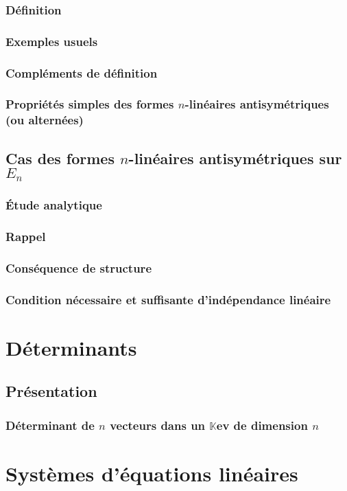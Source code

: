 \documentclass[12pt,a4paper,french]{book}
\begin{document}
		\subsection{Définition}
		\subsection{Exemples usuels}
		\subsection{Compléments de définition}
		\subsection{Propriétés simples des formes $n$-linéaires antisymétriques (ou alternées)}
	\section{Cas des formes $n$-linéaires antisymétriques sur $E_n$}
		\subsection{Étude analytique}
		\subsection{Rappel}
		\subsection{Conséquence de structure}
		\subsection{Condition nécessaire et suffisante d'indépendance linéaire}

\chapter{Déterminants}
	\section{Présentation}
		\subsection{Déterminant de $n$ vecteurs dans un $\mathbb{K}$ev de dimension $n$}
		
\chapter{Systèmes d'équations linéaires}
\end{document}
